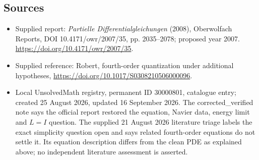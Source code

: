 \documentclass[11pt]{article}
\begin{document}
\subsection{Sources}
\begin{itemize}
\item Supplied report: \emph{Partielle Differentialgleichungen} (2008), Oberwolfach Reports, DOI 10.4171/owr/2007/35, pp. 2035--2078; proposed year 2007. \url{https://doi.org/10.4171/owr/2007/35}.
\item Supplied reference: Robert, fourth-order quantization under additional hypotheses, \url{https://doi.org/10.1017/S0308210506000096}.
\item Local UnsolvedMath registry, permanent ID 30000801, catalogue entry; created 25 August 2026, updated 16 September 2026. The corrected\_verified note says the official report restored the equation, Navier data, energy limit and $L=I$ question. The supplied 21 August 2026 literature triage labels the exact simplicity question open and says related fourth-order equations do not settle it. Its equation description differs from the clean PDE as explained above; no independent literature assessment is asserted.
\end{itemize}
\end{document}
